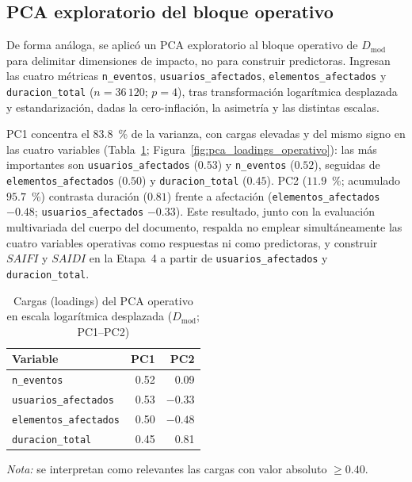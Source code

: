 \subsection{PCA exploratorio del bloque operativo}

De forma análoga, se aplicó un PCA exploratorio al bloque operativo de $D_{\mathrm{mod}}$ para delimitar dimensiones de impacto, no para construir predictoras. Ingresan las cuatro métricas \texttt{n\_eventos}, \texttt{usuarios\_afectados}, \texttt{elementos\_afectados} y \texttt{duracion\_total} ($n = 36\,120$; $p = 4$), tras transformación logarítmica desplazada y estandarización, dadas la cero-inflación, la asimetría y las distintas escalas.

PC1 concentra el $83{.}8$~\% de la varianza, con cargas elevadas y del mismo signo en las cuatro variables (Tabla~\ref{tab:pca_loadings_operativo}; Figura~\ref{fig:pca_loadings_operativo}): las más importantes son \texttt{usuarios\_afectados} ($0{.}53$) y \texttt{n\_eventos} ($0{.}52$), seguidas de \texttt{elementos\_afectados} ($0{.}50$) y \texttt{duracion\_total} ($0{.}45$). PC2 ($11{.}9$~\%; acumulado $95{.}7$~\%) contrasta duración ($0{.}81$) frente a afectación (\texttt{elementos\_afectados} $-0{.}48$; \texttt{usuarios\_afectados} $-0{.}33$). Este resultado, junto con la evaluación multivariada del cuerpo del documento, respalda no emplear simultáneamente las cuatro variables operativas como respuestas ni como predictoras, y construir $SAIFI$ y $SAIDI$ en la Etapa~4 a partir de \texttt{usuarios\_afectados} y \texttt{duracion\_total}.

\begin{table}[!htbp]
\centering
\small
\caption{Cargas (loadings) del PCA operativo en escala logarítmica desplazada ($D_{\mathrm{mod}}$; PC1--PC2)}
\label{tab:pca_loadings_operativo}
\begin{tabular}{@{}l r r@{}}
\toprule
\textbf{Variable} & \textbf{PC1} & \textbf{PC2} \\
\midrule
\texttt{n\_eventos}            & 0.52 &  0.09 \\
\texttt{usuarios\_afectados}  & 0.53 & $-0.33$ \\
\texttt{elementos\_afectados} & 0.50 & $-0.48$ \\
\texttt{duracion\_total}      & 0.45 &  0.81 \\
\bottomrule
\end{tabular}

\noindent\textit{Nota:} se interpretan como relevantes las cargas con valor absoluto $\geq 0{.}40$.
\end{table}

